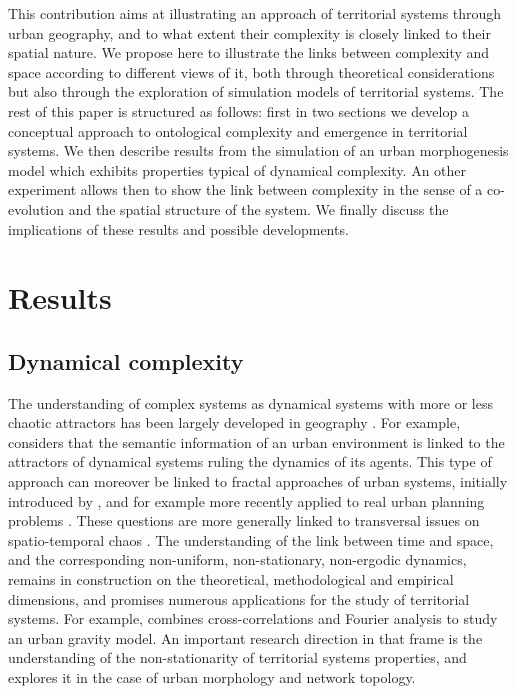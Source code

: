\documentclass[fleqn,10pt]{wlscirep}
\begin{document}
This contribution aims at illustrating an approach of territorial systems through urban geography, and to what extent their complexity is closely linked to their spatial nature. We propose here to illustrate the links between complexity and space according to different views of it, both through theoretical considerations but also through the exploration of simulation models of territorial systems. The rest of this paper is structured as follows: first in two sections we develop a conceptual approach to ontological complexity and emergence in territorial systems. We then describe results from the simulation of an urban morphogenesis model which exhibits properties typical of dynamical complexity. An other experiment allows then to show the link between complexity in the sense of a co-evolution and the spatial structure of the system. We finally discuss the implications of these results and possible developments.



\section*{Results}


\subsection*{Dynamical complexity}



The understanding of complex systems as dynamical systems with more or less chaotic attractors has been largely developed in geography \cite{dauphine1995chaos}. For example, \cite{e18060197} considers that the semantic information of an urban environment is linked to the attractors of dynamical systems ruling the dynamics of its agents. This type of approach can moreover be linked to fractal approaches of urban systems, initially introduced by \cite{batty1994fractal}, and for example more recently applied to real urban planning problems \cite{yamu2015spatial}. These questions are more generally linked to transversal issues on spatio-temporal chaos \cite{crutchfield1987phenomenology}. The understanding of the link between time and space, and the corresponding non-uniform, non-stationary, non-ergodic dynamics, remains in construction on the theoretical, methodological and empirical dimensions, and promises numerous applications for the study of territorial systems. For example, \cite{chen2009urban} combines cross-correlations and Fourier analysis to study an urban gravity model. An important research direction in that frame is the understanding of the non-stationarity of territorial systems properties, and \cite{raimbault2018urban} explores it in the case of urban morphology and network topology.
\end{document}
